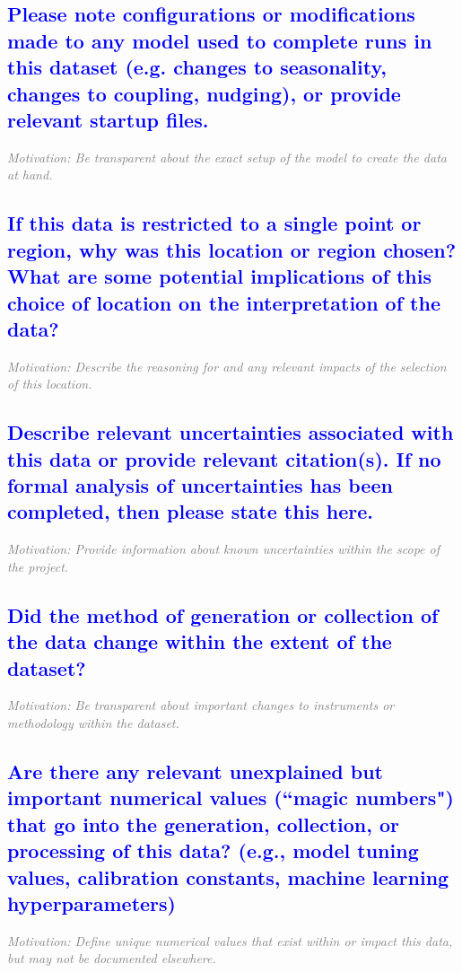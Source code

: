 \documentclass[letterpaper, 10 pt, transmag]{IEEEtran}
\begin{document}
\textcolor{blue}{\subsection{Please note configurations or modifications made to any model used to complete runs in this dataset (e.g. changes to seasonality, changes to coupling, nudging), or provide relevant startup files.}}
\textcolor{gray}{\textit{Motivation: Be transparent about the exact setup of the model to create the data at hand.}}

\textcolor{blue}{\subsection{If this data is restricted to a single point or region, why was this location or region chosen? What are some potential implications of this choice of location on the interpretation of the data?}}
\textcolor{gray}{\textit{Motivation: Describe the reasoning for and any relevant impacts of the selection of this location.}}

\textcolor{blue}{\subsection{Describe relevant uncertainties associated with this data or provide relevant citation(s). If no formal analysis of uncertainties has been completed, then please state this here.}}
\textcolor{gray}{\textit{Motivation: Provide information about known uncertainties within the scope of the project.}}

\textcolor{blue}{\subsection{Did the method of generation or collection of the data change within the extent of the dataset?}}
\textcolor{gray}{\textit{Motivation: Be transparent about important changes to instruments or methodology within the dataset.}}

\textcolor{blue}{\subsection{Are there any relevant unexplained but important numerical values (``magic numbers") that go into the generation, collection, or processing of this data? (e.g., model tuning values, calibration constants, machine learning hyperparameters)}}
\textcolor{gray}{\textit{Motivation: Define unique numerical values that exist within or impact this data, but may not be documented elsewhere.}}
\end{document}

